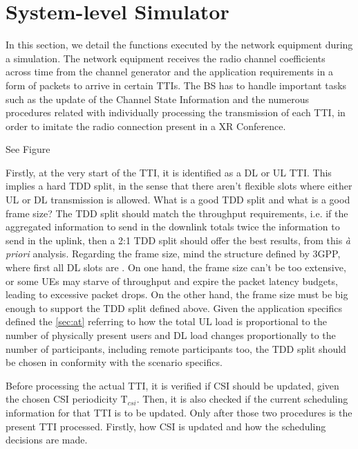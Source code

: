 \section{System-level Simulator}
\label{sec:sls}

In this section, we detail the functions executed by the network equipment during a simulation. The network equipment  receives the radio channel coefficients across time from the channel generator and the application requirements in a form of packets to arrive in certain \acp{TTI}. The BS has to handle important tasks such as the update of the Channel State Information and the numerous procedures related with individually processing the transmission of each \ac{TTI}, in order to imitate the radio connection present in a XR Conference. 




See Figure %

Firstly, at the very start of the TTI, it is identified as a DL or UL TTI. This implies a hard TDD split, in the sense that there aren't flexible slots where either UL or DL transmission is allowed. What is a good TDD split and what is a good frame size? The TDD split should match the throughput requirements, i.e. if the aggregated information to send in the downlink totals twice the information to send in the uplink, then a 2:1 TDD split should offer the best results, from this \textit{à priori} analysis. Regarding the frame size, mind the structure defined by 3GPP, where first all DL slots are . On one hand, the frame size can't be too extensive, or some UEs may starve of throughput and expire the packet latency budgets, leading to excessive packet drops. On the other hand, the frame size must be big enough to support the TDD split defined above. Given the application specifics defined the \ref{sec:at} referring to how the total UL load is proportional to the number of physically present users and DL load changes proportionally to the number of participants, including remote participants too, the TDD split should be chosen in conformity with the scenario specifics. 


Before processing the actual TTI, it is verified if CSI should be updated, given the chosen CSI periodicity $\text{T}_{csi}$. Then, it is also checked if the current scheduling information for that TTI is to be updated. Only after those two procedures is the present TTI processed. Firstly, how CSI is updated and how the scheduling decisions are made.

